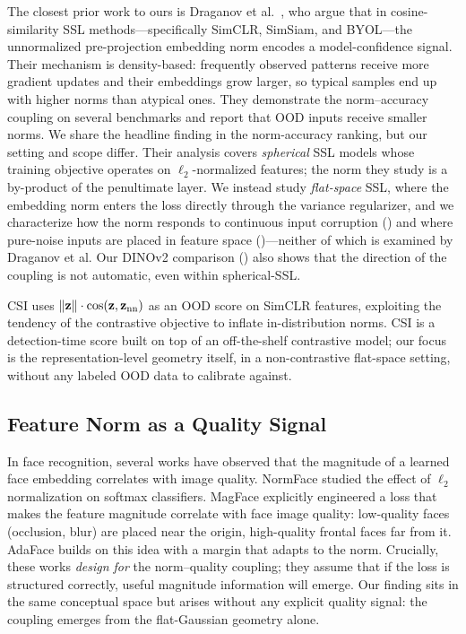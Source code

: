The closest prior work to ours is Draganov et al.~\citep{draganov2025embedding_norms}, who argue that in cosine-similarity SSL methods---specifically SimCLR, SimSiam, and BYOL---the unnormalized pre-projection embedding norm encodes a model-confidence signal. Their mechanism is density-based: frequently observed patterns receive more gradient updates and their embeddings grow larger, so typical samples end up with higher norms than atypical ones. They demonstrate the norm--accuracy coupling on several benchmarks and report that OOD inputs receive smaller norms. We share the headline finding in the norm-accuracy ranking, but our setting and scope differ. Their analysis covers \emph{spherical} SSL models whose training objective operates on $\ell_2$-normalized features; the norm they study is a by-product of the penultimate layer. We instead study \emph{flat-space} SSL, where the embedding norm enters the loss directly through the variance regularizer, and we characterize how the norm responds to continuous input corruption () and where pure-noise inputs are placed in feature space ()---neither of which is examined by Draganov et al. Our DINOv2 comparison () also shows that the direction of the coupling is not automatic, even within spherical-SSL.

CSI \citep{tack2020csi} uses $\|\mathbf{z}\| \cdot \cos(\mathbf{z}, \mathbf{z}_\text{nn})$ as an OOD score on SimCLR features, exploiting the tendency of the contrastive objective to inflate in-distribution norms. CSI is a detection-time score built on top of an off-the-shelf contrastive model; our focus is the representation-level geometry itself, in a non-contrastive flat-space setting, without any labeled OOD data to calibrate against.

\subsection{Feature Norm as a Quality Signal}

In face recognition, several works have observed that the magnitude of a learned face embedding correlates with image quality. NormFace \citep{wang2017normface} studied the effect of $\ell_2$ normalization on softmax classifiers. MagFace \citep{meng2021magface} explicitly engineered a loss that makes the feature magnitude correlate with face image quality: low-quality faces (occlusion, blur) are placed near the origin, high-quality frontal faces far from it. AdaFace \citep{kim2022adaface} builds on this idea with a margin that adapts to the norm. Crucially, these works \emph{design for} the norm--quality coupling; they assume that if the loss is structured correctly, useful magnitude information will emerge. Our finding sits in the same conceptual space but arises without any explicit quality signal: the coupling emerges from the flat-Gaussian geometry alone.


